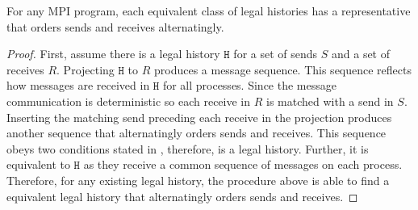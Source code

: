 \begin{theorem}
For any MPI program, each equivalent class of legal histories has a representative that orders sends and receives alternatingly.
\end{theorem}

\begin{proof}
First, assume there is a legal history $\mathtt{H}$ for a set of sends $\mathit{S}$ and a set of receives $\mathit{R}$. 
Projecting $\mathtt{H}$ to $\mathit{R}$ produces a message sequence. This sequence reflects how messages are received in $\mathtt{H}$ for all processes. Since the message communication is deterministic so each receive in $\mathit{R}$ is matched with a send in $\mathit{S}$. Inserting the matching send preceding each receive in the projection produces another sequence that alternatingly orders sends and receives. This sequence obeys two conditions stated in , therefore, is a legal history. Further, it is equivalent to $\mathtt{H}$ as they receive a common sequence of messages on each process.
Therefore, for any existing legal history, the procedure above is able to find a equivalent legal history that alternatingly orders sends and receives.  
\end{proof}



 


